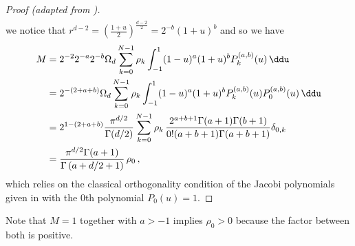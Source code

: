 \begin{proof}[Proof (adapted from \cite{2021-arbitrary-dimensions})]
\begin{align*}
  \end{align*}
  we notice that $r^{d-2} = \left(\frac{1+u}{2}\right)^{\frac{d-2}{2}} = 2^{-b} (1+u)^b$ and so we have
  \begin{align*}
    M & = 2^{-2} 2^{-a} 2^{-b} \Omega_d \sum_{k=0}^{N-1} \rho_k \int_{-1}^1 (1-u)^a (1+u)^{b} P_k^{(a,b)}(u) \,\ddu                                                 \\
      & = 2^{-(2+a+b)} \Omega_d \sum_{k=0}^{N-1} \rho_k \int_{-1}^1 (1-u)^a (1+u)^{b} P_k^{(a,b)}(u) P_0^{(a, b)}(u) \,\ddu                                         \\
      & = 2^{1-(2+a+b)} \frac{\pi^{d/2}}{\Gamma(d/2)} \sum_{k=0}^{N-1} \rho_k \, \frac{2^{a+b+1} \Gamma (a+1) \Gamma (b+1)}{0! (a+b+1) \Gamma (a+b+1)} \delta_{0,k} \\
      & = \frac{\pi^{{d/2}}\Gamma (a+1)}{\Gamma \left(a+{d/2}+1\right)} \,\rho_0\,,
  \end{align*}
  which relies on the classical orthogonality condition of the Jacobi polynomials given in  with the $0$th polynomial $P_0(u) = 1$.
\end{proof}

Note that $M = 1$ together with $a > -1$ implies $\rho_0 > 0$ because the factor between both is positive.

